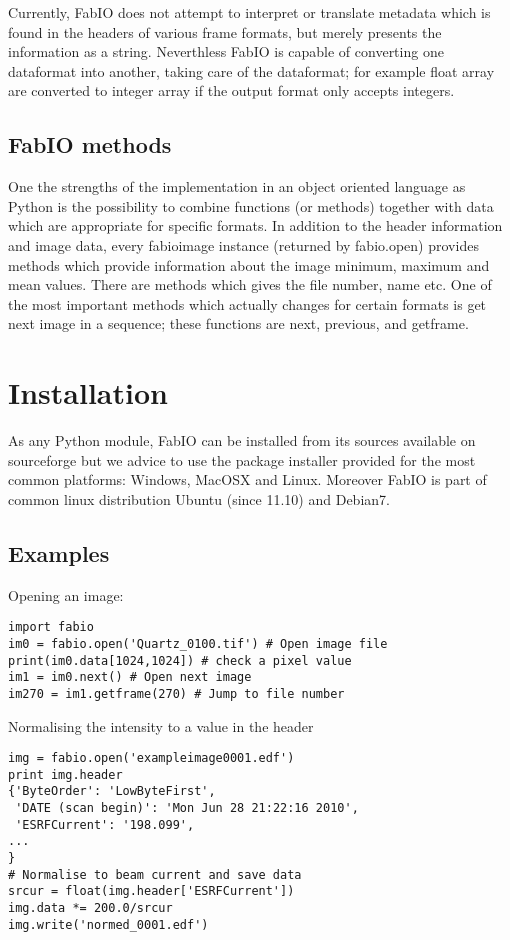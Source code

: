 \documentclass{iucr}
\begin{document}
Currently, FabIO does not attempt to interpret or translate metadata which
is found in the headers of various frame formats, but merely presents the
information as a string. Neverthless FabIO is capable of converting one
dataformat into another, taking care of the dataformat; for example float array
are converted to integer array if the output format only accepts integers.


\subsection{FabIO methods}

One the strengths of the implementation in an object oriented language as Python
is the possibility to combine functions (or methods) together with data which
are appropriate for specific formats.
In addition to the header information and image data, every fabioimage instance
(returned by fabio.open) provides methods which provide information about the image minimum, maximum and mean values.
There are methods which gives the file number, name etc. One of the most important methods which  actually changes for certain formats
is get next image in a sequence; these functions are next, previous, and
getframe.


\section{Installation}

As any Python module, FabIO can be installed from its sources available on sourceforge\cite{fabio}
but we advice to use the package installer provided for the most common
platforms: Windows, MacOSX and Linux. Moreover FabIO is part of common linux
distribution Ubuntu (since 11.10) and Debian7.

\subsection{Examples}

Opening an image:

\begin{verbatim}
import fabio     
im0 = fabio.open('Quartz_0100.tif') # Open image file
print(im0.data[1024,1024]) # check a pixel value
im1 = im0.next() # Open next image
im270 = im1.getframe(270) # Jump to file number
\end{verbatim}

Normalising the intensity to a value in the header

\begin{verbatim}
img = fabio.open('exampleimage0001.edf')
print img.header
{'ByteOrder': 'LowByteFirst',
 'DATE (scan begin)': 'Mon Jun 28 21:22:16 2010',
 'ESRFCurrent': '198.099',
...
}
# Normalise to beam current and save data
srcur = float(img.header['ESRFCurrent'])
img.data *= 200.0/srcur
img.write('normed_0001.edf')
\end{verbatim}
\end{document}
